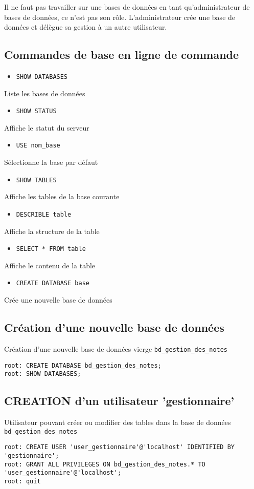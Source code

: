 \documentclass[11pt]{article}
\begin{document}
Il ne faut pas travailler sur une bases de données en tant qu'administrateur de bases de données, ce n'est pas son rôle.
L'administrateur crée une base de données et délègue sa gestion à un autre utilisateur.

\subsection{Commandes de base en ligne de commande}
\label{sec:orgba91dd8}
\begin{itemize}
\item \texttt{SHOW DATABASES}
\end{itemize}
Liste les bases de données
\begin{itemize}
\item \texttt{SHOW STATUS}
\end{itemize}
Affiche le statut du serveur
\begin{itemize}
\item \texttt{USE nom\_base}
\end{itemize}
Sélectionne la base par défaut
\begin{itemize}
\item \texttt{SHOW TABLES}
\end{itemize}
Affiche les tables de la base courante
\begin{itemize}
\item \texttt{DESCRIBLE table}
\end{itemize}
Affiche la structure de la table
\begin{itemize}
\item \texttt{SELECT * FROM table}
\end{itemize}
Affiche le contenu de la table
\begin{itemize}
\item \texttt{CREATE DATABASE base}
\end{itemize}
Crée une nouvelle base de données

\subsection{Création d'une nouvelle base de données}
\label{sec:org9e0448a}
Création d'une nouvelle base de données vierge \texttt{bd\_gestion\_des\_notes}
\begin{verbatim}
root: CREATE DATABASE bd_gestion_des_notes;
root: SHOW DATABASES;
\end{verbatim}

\subsection{CREATION d'un utilisateur 'gestionnaire'}
\label{sec:org70d3bc3}
Utilisateur pouvant créer ou modifier des tables dans la base de données \texttt{bd\_gestion\_des\_notes}
\begin{verbatim}
root: CREATE USER 'user_gestionnaire'@'localhost' IDENTIFIED BY 'gestionnaire';
root: GRANT ALL PRIVILEGES ON bd_gestion_des_notes.* TO 'user_gestionnaire'@'localhost';
root: quit
\end{verbatim}
\end{document}
